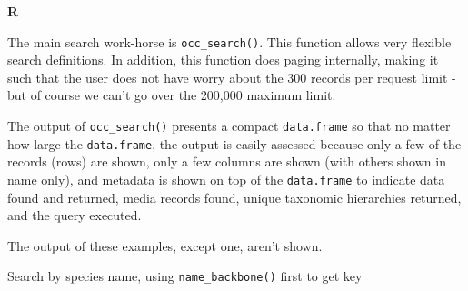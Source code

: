 \documentclass[author-year, review, 11pt]{components/elsarticle} %
\begin{document}
\textbf{R}

The main search work-horse is \texttt{occ\_search()}. This function
allows very flexible search definitions. In addition, this function does
paging internally, making it such that the user does not have worry
about the 300 records per request limit - but of course we can't go over
the 200,000 maximum limit.

The output of \texttt{occ\_search()} presents a compact
\texttt{data.frame} so that no matter how large the \texttt{data.frame},
the output is easily assessed because only a few of the records (rows)
are shown, only a few columns are shown (with others shown in name
only), and metadata is shown on top of the \texttt{data.frame} to
indicate data found and returned, media records found, unique taxonomic
hierarchies returned, and the query executed.

The output of these examples, except one, aren't shown.

Search by species name, using \texttt{name\_backbone()} first to get key
\end{document}
